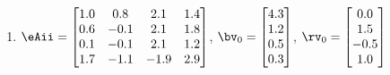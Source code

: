 \begin{exercise}
\begin{enumerate}
\item \(\eAii=\begin{bmatrix} 1.0&0.8&2.1&1.4
\\0.6&-0.1&2.1&1.8
\\0.1&-0.1&2.1&1.2
\\1.7&-1.1&-1.9&2.9 \end{bmatrix}\),
\(\bv_{\arabic{enumii}}=\begin{bmatrix} 4.3
\\1.2
\\0.5
\\0.3 \end{bmatrix}\),
\(\rv_{\arabic{enumii}}=\begin{bmatrix} 0.0
\\1.5
\\-0.5
\\1.0 \end{bmatrix}\)

\end{enumerate}
\end{exercise}


